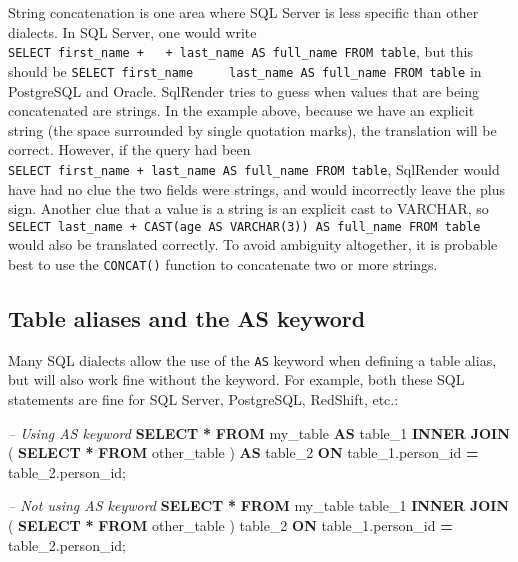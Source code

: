 \documentclass[
]{article}
\newenvironment{Shaded}{\begin{snugshade}}{\end{snugshade}}
\newcommand{\CommentTok}[1]{\textcolor[rgb]{0.56,0.35,0.01}{\textit{#1}}}
\newcommand{\KeywordTok}[1]{\textcolor[rgb]{0.13,0.29,0.53}{\textbf{#1}}}
\newcommand{\NormalTok}[1]{#1}
\newcommand{\OperatorTok}[1]{\textcolor[rgb]{0.81,0.36,0.00}{\textbf{#1}}}
\begin{document}
String concatenation is one area where SQL Server is less specific than
other dialects. In SQL Server, one would write
\texttt{SELECT\ first\_name\ +\ \textquotesingle{}\ \textquotesingle{}\ +\ last\_name\ AS\ full\_name\ FROM\ table},
but this should be
\texttt{SELECT\ first\_name\ \textbar{}\textbar{}\ \textquotesingle{}\ \textquotesingle{}\ \textbar{}\textbar{}\ last\_name\ AS\ full\_name\ FROM\ table}
in PostgreSQL and Oracle. SqlRender tries to guess when values that are
being concatenated are strings. In the example above, because we have an
explicit string (the space surrounded by single quotation marks), the
translation will be correct. However, if the query had been
\texttt{SELECT\ first\_name\ +\ last\_name\ AS\ full\_name\ FROM\ table},
SqlRender would have had no clue the two fields were strings, and would
incorrectly leave the plus sign. Another clue that a value is a string
is an explicit cast to VARCHAR, so
\texttt{SELECT\ last\_name\ +\ CAST(age\ AS\ VARCHAR(3))\ AS\ full\_name\ FROM\ table}
would also be translated correctly. To avoid ambiguity altogether, it is
probable best to use the \texttt{CONCAT()} function to concatenate two
or more strings.

\hypertarget{table-aliases-and-the-as-keyword}{%
\subsection{Table aliases and the AS
keyword}\label{table-aliases-and-the-as-keyword}}

Many SQL dialects allow the use of the \texttt{AS} keyword when defining
a table alias, but will also work fine without the keyword. For example,
both these SQL statements are fine for SQL Server, PostgreSQL, RedShift,
etc.:

\begin{Shaded}
\begin{Highlighting}[]
\CommentTok{-- Using AS keyword}
\KeywordTok{SELECT} \OperatorTok{*} 
\KeywordTok{FROM}\NormalTok{ my_table }\KeywordTok{AS}\NormalTok{ table_1}
\KeywordTok{INNER} \KeywordTok{JOIN}\NormalTok{ (}
  \KeywordTok{SELECT} \OperatorTok{*} \KeywordTok{FROM}\NormalTok{ other_table}
\NormalTok{) }\KeywordTok{AS}\NormalTok{ table_2}
\KeywordTok{ON}\NormalTok{ table_1.person_id }\OperatorTok{=}\NormalTok{ table_2.person_id;}

\CommentTok{-- Not using AS keyword}
\KeywordTok{SELECT} \OperatorTok{*} 
\KeywordTok{FROM}\NormalTok{ my_table table_1}
\KeywordTok{INNER} \KeywordTok{JOIN}\NormalTok{ (}
  \KeywordTok{SELECT} \OperatorTok{*} \KeywordTok{FROM}\NormalTok{ other_table}
\NormalTok{) table_2}
\KeywordTok{ON}\NormalTok{ table_1.person_id }\OperatorTok{=}\NormalTok{ table_2.person_id;}
\end{Highlighting}
\end{Shaded}
\end{document}
